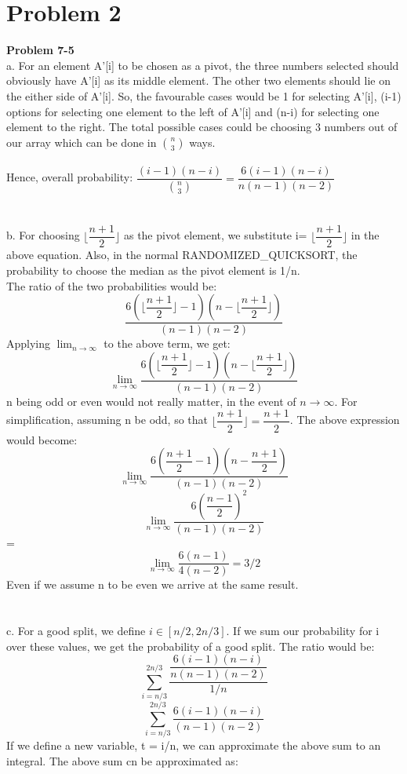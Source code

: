 \documentclass[10pt]{article}
\begin{document}
\section{Problem 2}
\textbf{Problem 7-5}\\
a. For an element A'[i] to be chosen as a pivot, the three numbers selected should obviously have A'[i] as its middle element. The other two elements should lie on the either side of A'[i]. So, the favourable cases would be 1 for selecting A'[i], (i-1) options for selecting one element to the left of A'[i] and (n-i) for selecting one element to the right. The total possible cases could be choosing 3 numbers out of our array which can be done in $n \choose 3$ ways.\\ \\
Hence, overall probability: $\dfrac{(i-1)(n-i)}{{n\choose 3}}
= \dfrac{6(i-1)(n-i)}{n(n-1)(n-2)}$\\\\\\
b. For choosing $\lfloor \dfrac{n+1}{2} \rfloor$ as the pivot element, we substitute i= $\lfloor \dfrac{n+1}{2} \rfloor$ in the above equation. Also, in the normal RANDOMIZED\_QUICKSORT, the probability to choose the median as the pivot element is 1/n.\\
The ratio of the two probabilities would be:
$$\dfrac{6(\lfloor \dfrac{n+1}{2} \rfloor-1)(n-\lfloor \dfrac{n+1}{2} \rfloor)}{(n-1)(n-2)}$$
Applying $\lim_{n \to \infty}$ to the above term, we get:
$$\lim_{n \to \infty} \dfrac{6(\lfloor \dfrac{n+1}{2} \rfloor-1)(n-\lfloor \dfrac{n+1}{2} \rfloor)}{(n-1)(n-2)}$$
n being odd or even would not really matter, in the event of $n \to \infty$. For simplification, assuming n be odd, so that $\lfloor \dfrac{n+1}{2} \rfloor = \dfrac{n+1}{2}$. The above expression would become:\\
$$\lim_{n \to \infty} \dfrac{6(\dfrac{n+1}{2}-1)(n-\dfrac{n+1}{2})}{(n-1)(n-2)}$$
$$\lim_{n \to \infty} \dfrac{6(\dfrac{n-1}{2})^2}{(n-1)(n-2)}$$
= $$\lim_{n \to \infty}\dfrac{6(n-1)}{4(n-2)} = 3/2$$
Even if we assume n to be even we arrive at the same result.\\\\\\
c. For a good split, we define $i \in [n/2, 2n/3]$. If we sum our probability for i over these values, we get the probability of a good split. The ratio would be:
$$\sum_{i=n/3}^{2n/3}\dfrac{\dfrac{6(i-1)(n-i)}{n(n-1)(n-2)}}{1/n}$$
$$\sum_{i=n/3}^{2n/3}\dfrac{6(i-1)(n-i)}{(n-1)(n-2)}$$
If we define a new variable, t = i/n, we can approximate the above sum to an integral. The above sum cn be approximated as:
\end{document}
